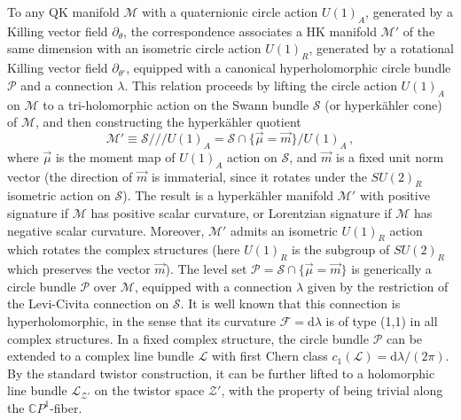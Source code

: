 \documentclass[12pt,reqno]{article}
\numberwithin{equation}{section}
\newcommand{\be}{\begin{equation}}
\newcommand{\ee}{\end{equation}}
\newcommand{\CP}{\IC P^1}
\newcommand{\de}{\mathrm{d}}
\newcommand{\cS}{\mathcal{S}}
\newcommand{\cM}{\mathcal{M}}
\newcommand{\cP}{\mathcal{P}}
\newcommand{\cZ}{\mathcal{Z}}
\newcommand{\IC}{\mathbb{C}}
\newcommand{\fb}{\mathscr{F}}
\newcommand{\lb}{\mathscr{L}}
\newcommand{\hk}{{hyperk\"ahler}\xspace}
\def\sigp{{\theta}}
\def\phip{{\theta'}}
\def\pcM{\cM'}
\def\pcZ{\cZ'}
\def\conhyper{\lambda}
\numberwithin{equation}{section}
\begin{document}
To any QK manifold $\cM$ with a quaternionic circle action $U(1)_A$,
generated by a Killing vector field $\partial_{\sigp}$,
the correspondence associates a HK manifold $\pcM$ of the same
dimension with an isometric  circle action $U(1)_R$,
generated by a rotational Killing  vector field $\partial_{\phip}$,
equipped with a canonical hyperholomorphic circle bundle $\cP$ and a connection
$\conhyper$.
This relation proceeds by lifting the  circle action $U(1)_A$
 on $\cM$ to a tri-holomorphic action on the Swann bundle $\cS$ (or \hk cone)
of $\cM$, and then constructing the \hk quotient
\be
\pcM\equiv \cS///U(1)_A
=\cS\cap \{\vec\mu=\vec m\}/U(1)_A\, ,
\ee
where $\vec\mu$ is the moment map of $U(1)_A$ action on $\cS$,
and $\vec m$ is a fixed unit norm vector (the direction of $\vec m$ is
immaterial, since it rotates under the $SU(2)_R$ isometric action on $\cS$).
The  result is a \hk
manifold $\pcM$ with positive signature if $\cM$ has positive scalar curvature, or
Lorentzian signature if $\cM$ has negative scalar curvature. Moreover, $\pcM$ admits
an isometric $U(1)_R$ action
which rotates the complex structures (here
$U(1)_R$ is the subgroup of  $SU(2)_R$
which preserves the vector $\vec m$). The level
set $\cP = \cS\cap\{\vec\mu=\vec m\}$ is
generically a circle bundle $\cP$ over $\cM$, equipped with a connection
$\conhyper$ given by the restriction of the Levi-Civita connection on $\cS$.
It is well known that this connection is hyperholomorphic, in the sense that
its curvature $\fb=\de\conhyper$ is of type (1,1) in all complex structures.
In a fixed complex structure, the circle bundle $\cP$ can
be extended to a complex line bundle $\lb$ with first Chern class $c_1(\lb)=\de\conhyper/(2\pi)$.
By the standard twistor construction,
it can be further lifted to  a holomorphic line bundle $\lb_{\pcZ}$ on the twistor
space $\pcZ$, with the property of being trivial along the $\CP$-fiber.
\end{document}
